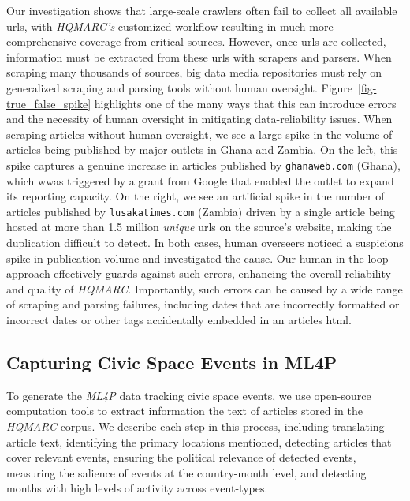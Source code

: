 \documentclass[
  letterpaper,
  DIV=11,
  numbers=noendperiod]{scrartcl}
\begin{document}
Our investigation shows that large-scale crawlers often fail to collect
all available urls, with \emph{HQMARC's} customized workflow resulting
in much more comprehensive coverage from critical sources. However, once
urls are collected, information must be extracted from these urls with
scrapers and parsers. When scraping many thousands of sources, big data
media repositories must rely on generalized scraping and parsing tools
without human oversight. Figure~\ref{fig-true_false_spike} highlights
one of the many ways that this can introduce errors and the necessity of
human oversight in mitigating data-reliability issues. When scraping
articles without human oversight, we see a large spike in the volume of
articles being published by major outlets in Ghana and Zambia. On the
left, this spike captures a genuine increase in articles published by
\texttt{ghanaweb.com} (Ghana), which wwas triggered by a grant from
Google that enabled the outlet to expand its reporting capacity. On the
right, we see an artificial spike in the number of articles published by
\texttt{lusakatimes.com} (Zambia) driven by a single article being
hosted at more than 1.5 million \emph{unique} urls on the source's
website, making the duplication difficult to detect. In both cases,
human overseers noticed a suspicions spike in publication volume and
investigated the cause. Our human-in-the-loop approach effectively
guards against such errors, enhancing the overall reliability and
quality of \emph{HQMARC}. Importantly, such errors can be caused by a
wide range of scraping and parsing failures, including dates that are
incorrectly formatted or incorrect dates or other tags accidentally
embedded in an articles html.

\hypertarget{capturing-civic-space-events-in-ml4p}{%
\subsection{Capturing Civic Space Events in
ML4P}\label{capturing-civic-space-events-in-ml4p}}

To generate the \emph{ML4P} data tracking civic space events, we use
open-source computation tools to extract information the text of
articles stored in the \emph{HQMARC} corpus. We describe each step in
this process, including translating article text, identifying the
primary locations mentioned, detecting articles that cover relevant
events, ensuring the political relevance of detected events, measuring
the salience of events at the country-month level, and detecting months
with high levels of activity across event-types.
\end{document}
